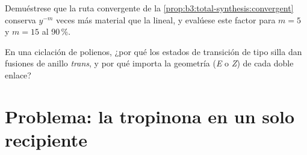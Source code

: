 \begin{exercise}[$\star\star\star$]\label{exo:b3:total-synthesis:11}
Demuéstrese que la ruta convergente de la \cref{prop:b3:total-synthesis:convergent} conserva
$y^{-m}$ veces más material que la lineal, y evalúese este factor para $m = 5$ y
$m = 15$ al 90\,\%.
\end{exercise}

\begin{exercise}[$\star\star\star$]\label{exo:b3:total-synthesis:12}
En una ciclación de polienos, ¿por qué los estados de transición de tipo silla dan fusiones de anillo
\textit{trans}, y por qué importa la geometría (\textit{E} o \textit{Z}) de cada doble enlace?
\end{exercise}

\section{Problema: la tropinona en un solo recipiente}

